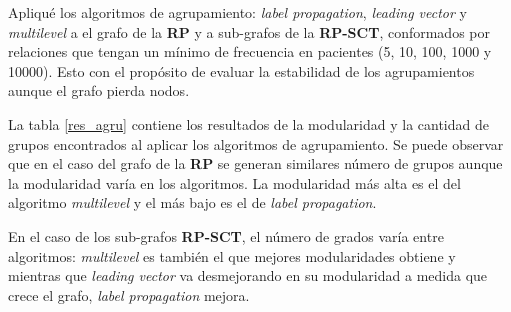 Apliqué los algoritmos de agrupamiento: \textit{label propagation}, \textit{leading vector} y \textit{multilevel} a el grafo de la \textbf{\acrshort{RP}} y a sub-grafos de la  \textbf{\acrshort{RP-SCT}}, conformados por relaciones que tengan un mínimo de frecuencia en pacientes (\num{5}, \num{10}, \num{100}, \num{1000} y \num{10000}). Esto con el propósito de evaluar la estabilidad de los agrupamientos aunque el grafo pierda nodos.

La tabla \ref{res_agru} contiene los resultados de la modularidad y la cantidad de grupos encontrados al aplicar los algoritmos de agrupamiento. Se puede observar que en el caso del grafo de la \textbf{\acrshort{RP}}  se generan similares número de grupos aunque la modularidad varía en los algoritmos. La modularidad más alta es el del algoritmo \textit{multilevel} y el más bajo es el de \textit{label propagation}.

En el caso de los sub-grafos \textbf{\acrshort{RP-SCT}}, el número de grados varía entre algoritmos: \textit{multilevel} es también el que mejores modularidades obtiene y mientras que \textit{leading vector} va desmejorando en su modularidad a medida que crece el grafo, \textit{label propagation} mejora. 

